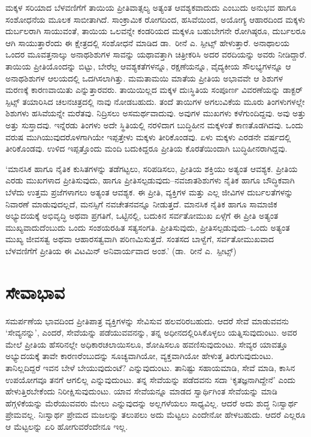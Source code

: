 ಮಕ್ಕಳ ಸರಿಯಾದ ಬೆಳವಣಿಗೆಗೆ ತಾಯಿಯ ಪ್ರೀತಿವಾತ್ಸಲ್ಯ ಅತ್ಯಂತ ಆವಶ್ಯಕವಾದುದು ಎಂಬುದು ಅನುಭವ ಹಾಗೂ ಸಂಶೋಧನೆಯ ಮೂಲಕ ಸಾಬೀತಾಗಿದೆ. ಸಾಂಕ್ರಾಮಿಕ ರೋಗದಿಂದ, ಹಸಿವೆಯಿಂದ, ಅಯೋಗ್ಯ ಆಹಾರದಿಂದ ಮಕ್ಕಳು ದುರ್ಬಲರಾಗಿ ಸಾಯುವಂತೆ, ತಾಯಿಯ ಒಲವನ್ನೇ ಕಂಡರಿಯದ ಮಕ್ಕಳೂ ಬಹುಬೇಗನೇ ರೋಗಿಷ್ಠರೂ, ದುರ್ಬಲರೂ ಆಗಿ ಸಾಯುತ್ತಾರೆಂದು ಈ ಕ್ಷೇತ್ರದಲ್ಲಿ ಸಂಶೋಧನೆ ಮಾಡಿದ ಡಾ.\ ರೀನೆ ಎ. ಸ್ಪೀಟ್ಸ್​ ಹೇಳುತ್ತಾರೆ. ಅನಾಥಾಲಯ ಒಂದರ ಮೂವತ್ತನಾಲ್ಕು ಅನಾಥಶಿಶುಗಳ ಸಾವನ್ನು ಯಥಾವತ್ತಾಗಿ ಚಿತ್ರೀಕರಿಸಿ ಅದರ ವರದಿಯನ್ನು ಅವರು ನೀಡಿದ್ದಾರೆ. ತಾಯಿಯ ಪ್ರೀತಿಯೊಂದನ್ನು ಬಿಟ್ಟು, ಬೇರೆಲ್ಲ ಆವಶ್ಯಕತೆಗಳನ್ನೂ, ರಕ್ಷಣೆಯನ್ನೂ, ವೈದ್ಯಕೀಯ ಸೌಲಭ್ಯಗಳನ್ನೂ ಆ ಅನಾಥಶಿಶುಗಳ ಆಲಯದಲ್ಲಿ ಒದಗಿಸಲಾಗಿತ್ತು. ಮಮತಾಮಯಿ ಮಾತೆಯ ಪ್ರೀತಿಯ ಅಭಾವವೇ ಆ ಶಿಶುಗಳ ಮರಣಕ್ಕೆ ಕಾರಣವಾಯಿತು ಎನ್ನುತ್ತಾರವರು. ತಾಯಿಯಿಲ್ಲದ ಮಕ್ಕಳ ದುಃಸ್ಥಿತಿಯ ಸಂಪೂರ್ಣ ವಿವರಣೆಯನ್ನು ಡಾಕ್ಟರ್ ಸ್ಪಿಟ್ಸ್ ತಯಾರಿಸಿದ ಚಲನಚಿತ್ರದಲ್ಲಿ ನಾವು ನೋಡಬಹುದು. ತಂದೆ ತಾಯಿಗಳ ಅಗಲುವಿಕೆಯ ಮೂರು ತಿಂಗಳುಗಳಲ್ಲೇ ಶಿಶುಗಳು ಹಸಿವೆಯನ್ನೇ ಮರೆತವು. ನಿದ್ರಿಸಲು ಅಸಮರ್ಥವಾದುವು. ಅವುಗಳ ಮುಖಗಳು ಕಳೆಗುಂದಿದ್ದವು. ಅವು ಅತ್ತು ಅತ್ತು ಸುಸ್ತಾದವು. ಇನ್ನೆರಡು ತಿಂಗಳು ಅದೇ ಸ್ಥಿತಿಯಲ್ಲಿ ನರಳಿದಾಗ ಬುದ್ಧಿಹೀನ ಮಕ್ಕಳಂತೆ ಕಾಣತೊಡಗಿದವು. ಒಂದು ವರುಷ ಮುಗಿಯುವುದರೊಳಗಾಗಿಯೇ ಇಪ್ಪತ್ತೇಳು ಮಕ್ಕಳು ತೀರಿಕೊಂಡವು. ಏಳು ಮಕ್ಕಳು ಎರಡನೇ ವರ್ಷದಲ್ಲಿ ತೀರಿಕೊಂಡವು. ಉಳಿದ ಇಪ್ಪತ್ತೊಂದು ಮಂದಿ ಬದುಕಿದ್ದರೂ ಪ್ರೀತಿಯ ಕೊರತೆಯಿಂದಾಗಿ ಬುದ್ಧಿಹೀನರಾಗಿದ್ದವು.

‘ಮಾನಸಿಕ ಹಾಗೂ ನೈತಿಕ ಕುಸಿತಗಳನ್ನು ತಡೆಗಟ್ಟಲು, ಸರಿಪಡಿಸಲು, ಪ್ರೀತಿಯ ಶಕ್ತಿಯು ಅತ್ಯಂತ ಆವಶ್ಯಕ. ಪ್ರೀತಿಯ ಎರಡು ಮುಖಗಳಾದ ಪ್ರೀತಿಸುವುದು, ಹಾಗೂ ಪ್ರೀತಿಸಲ್ಪಡು\-ವುದು–ನವಜಾತಶಿಶುಗಳು ನೈತಿಕ ಹಾಗೂ ಬೌದ್ಧಿಕವಾಗಿ ಬೆಳೆದು ಉತ್ತಮ ಪ್ರಜೆಗಳಾಗಲು ಅತ್ಯಂತ ಆವಶ್ಯಕ. ಈ ಪ್ರೀತಿ, ವ್ಯಕ್ತಿಗಳ ಮತ್ತು ಎಲ್ಲ ಜೀವಿಗಳ ದುರ್ಬಲತೆಗಳನ್ನು ನಿವಾರಣೆ ಮಾಡುವು\-ದಲ್ಲದೆ, ಮನಸ್ಸಿಗೆ ನವಚೇತನವನ್ನೂ ನೀಡುತ್ತದೆ. ಮಾನಸಿಕ ನೈತಿಕ ಹಾಗೂ ಸಾಮಾಜಿಕ ಅಭ್ಯುದಯಕ್ಕೆ ಅಭಿವೃದ್ಧಿ ಅಥವಾ ಪ್ರಗತಿಗೆ, ಒಟ್ಟಿನಲ್ಲಿ, ಬದುಕಿನ ಸರ್ವತೋಮುಖ ಏಳ್ಗೆಗೆ ಈ ಪ್ರೀತಿ ಅತ್ಯಂತ ಮುಖ್ಯವಾದುದೆಂಬುದು ಒಂದು ಸಂಶಯರಹಿತ ಸತ್ಯಸಂಗತಿ. ಪ್ರೀತಿಸುವುದು, ಪ್ರೀತಿಸಲ್ಪಡುವುದು–ಒಂದು ಅತ್ಯಂತ ಮುಖ್ಯ ಜೀವಸತ್ವ ಅಥವಾ ಆಹಾರಸತ್ವವಾಗಿ ಪರಿಣಮಿಸುತ್ತದೆ. ಸಂತಸದ ಬಾಳ್ವೆಗೆ, ಸರ್ವತೋಮುಖವಾದ ಬೆಳವಣಿಗೆಗೆ ಪ್ರೀತಿಯ ಈ ವಿಟಮಿನ್ ಅನಿ\-ವಾರ್ಯ\-ವಾದ ಅಂಶ.’ (ಡಾ.\ ರೀನೆ ಎ.\ ಸ್ಪೀಟ್ಸ್​)


\section*{ಸೇವಾಭಾವ}


ಸಮರ್ಪಣೆಯ ಭಾವದಿಂದ ಪ್ರೀತಿಪಾತ್ರ ವ್ಯಕ್ತಿಗಳನ್ನು ಸೇವಿಸುವ ಹಲವರಿರಬಹುದು. ಆದರೆ ಸೇವೆ ಮಾಡುವವನು ‘ಸೇವ್ಯನನ್ನು’, ಎಂದರೆ, ಸೇವೆಯನ್ನು ಪಡೆಯುವವನನ್ನು, ತನ್ನ ಅಧೀನ\-ದಲ್ಲಿರಿಸಿಕೊಳ್ಳಲು ಯತ್ನಿಸುವುದುಂಟು. ಅವರ ಮೇಲೆ ಪ್ರೀತಿಯ ಹೆಸರಿನಲ್ಲೇ ಅಧಿಕಾರ\break ಚಲಾಯಿಸಲೂ, ಶೋಷಿಸಲೂ ಹವಣಿಸುವುದುಂಟು. ಸೇವ್ಯರ ಯಾವತ್ತೂ ಅಭ್ಯುದಯಕ್ಕೆ ತಾವೇ ಕಾರಣರೆಂಬುದನ್ನು ಸೂಚ್ಯವಾಗಿಯೋ, ವ್ಯಕ್ತವಾಗಿಯೋ ಹೇಳುತ್ತ ತಿರುಗುವುದುಂಟು. ತಾನಿಲ್ಲದಿದ್ದರೆ ಇವನ ಬೇಳೆ ಬೇಯುವುದುಂಟೆ? ಎನ್ನುವುದುಂಟು. ತಾನಿಷ್ಟು ಸಹಾಯಮಾಡಿ, ಸೇವೆ ಮಾಡಿ, ಕಾಸಿನ ಉಪಯೋಗವೂ ತನಗೆ ಆಗಲಿಲ್ಲ ಎನ್ನುವುದುಂಟು. ತನ್ನ ಸೇವೆಯನ್ನು ಪಡೆದವನು ಸದಾ ‘ಕೃತಜ್ಞನಾಗಿದ್ದೇನೆ’ ಎಂದು ಹೇಳುತ್ತಿರಬೇಕೆಂದು ನಿರೀಕ್ಷಿಸುವುದುಂಟು. ಯಾವ ಸೇವೆಯನ್ನೂ ಮಾಡದ ಸ್ವಾರ್ಥಿಗಿಂತ ಸೇವೆಯನ್ನು ಮಾಡಿ ಹೆಗ್ಗಳಿಕೆಯನ್ನು ಮೆರೆಯುವವರು ಮೇಲು ಎನ್ನುವುದನ್ನು ಅಲ್ಲಗಳೆಯಲು ಸಾಧ್ಯವಿಲ್ಲ. ಆದರೆ ಅದು ಶುದ್ಧ ನಿಃಸ್ವಾರ್ಥ ಪ್ರೇಮವಲ್ಲ. ನಿಃಸ್ವಾರ್ಥ ಪ್ರೇಮದ ಮಜಲನ್ನು ತಲುಪಲು ಅದು ಮೆಟ್ಟಲು ಎಂದೇನೋ ಹೇಳಬಹುದು. ಆದರೆ ಎಲ್ಲರೂ ಆ ಮೆಟ್ಟಲನ್ನು ಏರಿ ಹೋಗುವರೆಂದೇನೂ ಇಲ್ಲ.

